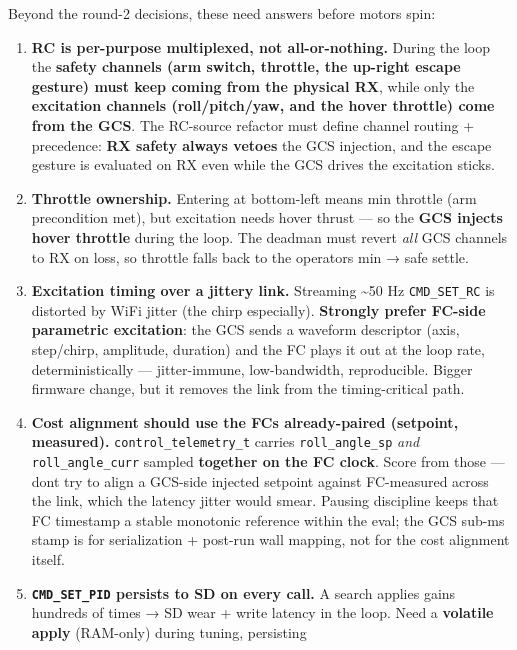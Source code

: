 \documentclass[
  11pt,
]{article}
\providecommand{\tightlist}{%
  \setlength{\itemsep}{0pt}\setlength{\parskip}{0pt}}
\begin{document}
Beyond the round-2 decisions, these need answers before motors spin:

\begin{enumerate}
\def\labelenumi{\arabic{enumi}.}
\tightlist
\item
  \textbf{RC is per-purpose multiplexed, not all-or-nothing.} During the
  loop the \textbf{safety channels (arm switch, throttle, the up-right
  escape gesture) must keep coming from the physical RX}, while only the
  \textbf{excitation channels (roll/pitch/yaw, and the hover throttle)
  come from the GCS}. The RC-source refactor must define channel routing
  + precedence: \textbf{RX safety always vetoes} the GCS injection, and
  the escape gesture is evaluated on RX even while the GCS drives the
  excitation sticks.
\item
  \textbf{Throttle ownership.} Entering at bottom-left means min
  throttle (arm precondition met), but excitation needs hover thrust ---
  so the \textbf{GCS injects hover throttle} during the loop. The
  deadman must revert \emph{all} GCS channels to RX on loss, so throttle
  falls back to the operator\textquotesingle s min → safe settle.
\item
  \textbf{Excitation timing over a jittery link.} Streaming
  \textasciitilde50 Hz \texttt{CMD\_SET\_RC} is distorted by WiFi jitter
  (the chirp especially). \textbf{Strongly prefer FC-side parametric
  excitation}: the GCS sends a waveform descriptor (axis, step/chirp,
  amplitude, duration) and the FC plays it out at the loop rate,
  deterministically --- jitter-immune, low-bandwidth, reproducible.
  Bigger firmware change, but it removes the link from the
  timing-critical path.
\item
  \textbf{Cost alignment should use the FC\textquotesingle s
  already-paired (setpoint, measured).} \texttt{control\_telemetry\_t}
  carries \texttt{roll\_angle\_sp} \emph{and} \texttt{roll\_angle\_curr}
  sampled \textbf{together on the FC clock}. Score from those ---
  don\textquotesingle t try to align a GCS-side injected setpoint
  against FC-measured across the link, which the latency jitter would
  smear. Pausing discipline keeps that FC timestamp a stable monotonic
  reference within the eval; the GCS sub-ms stamp is for serialization +
  post-run wall mapping, not for the cost alignment itself.
\item
  \textbf{\texttt{CMD\_SET\_PID} persists to SD on every call.} A search
  applies gains hundreds of times → SD wear + write latency in the loop.
  Need a \textbf{volatile apply} (RAM-only) during tuning, persisting

\end{enumerate}
\end{document}
